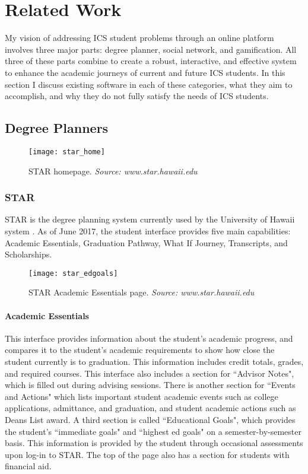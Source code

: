 \chapter{Related Work}

My vision of addressing ICS student problems through an online platform involves three major parts: degree planner, social network, and gamification. All three of these parts combine to create a robust, interactive, and effective system to enhance the academic journeys of current and future ICS students. In this section I discuss existing software in each of these categories, what they aim to accomplish, and why they do not fully satisfy the needs of ICS students.

\section{Degree Planners}
\begin{figure}[h]
\centering
\texttt{[image: star\_home]}
\caption{STAR homepage. \textit{Source: www.star.hawaii.edu}}
\end{figure}
\subsection{STAR}
STAR is the degree planning system currently used by the University of Hawaii system \cite{STAR}. As of June 2017, the student interface provides five main capabilities: Academic Essentials, Graduation Pathway, What If Journey, Transcripts, and Scholarships. 

\begin{figure}[h]
\centering
\texttt{[image: star\_edgoals]}
\caption{STAR Academic Essentials page. \textit{Source: www.star.hawaii.edu}}
\end{figure}
\subsubsection{Academic Essentials}
This interface provides information about the student's academic progress, and compares it to the student's academic requirements to show how close the student currently is to graduation. This information includes credit totals, grades, and required courses. This interface also includes a section for ``Advisor Notes", which is filled out during advising sessions. There is another section for ``Events and Actions" which lists important student academic events such as college applications, admittance, and graduation, and student academic actions such as Deans List award. A third section is called ``Educational Goals", which provides the student's ``immediate goals" and ``highest ed goals" on a semester-by-semester basis. This information is provided by the student through occasional assessments upon log-in to STAR. The top of the page also has a section for students with financial aid.

